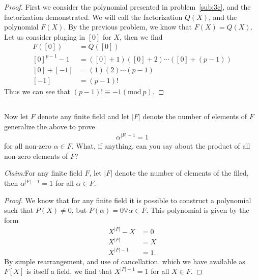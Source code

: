 \documentclass[10pt]{amsart}
\renewcommand{\mod}[2]{#1\left(\text{mod}\ #2\right)}
\newenvironment{claim}[1]{\par\noindent\textit{Claim:}\space#1}{}
\begin{document}
\begin{proof}
  First we consider the polynomial presented in problem~\ref{sub:3c}, and the
  factorization demonstrated. We will call the factorization $Q(X)$, and the
  polynomial $F(X)$. By the previous problem, we know that $F(X)=Q(X)$. Let us
  consider pluging in $[0]$ for $X$, then we find
  \begin{align*}
    F([0])&=Q([0])\\
    {[0]}^{p-1}-1&=([0]+1)([0]+2)\cdots([0]+(p-1))\\
    [0]+[-1]&=(1)(2)\cdots(p-1)\\
    [-1]&=(p-1)!
  \end{align*}
  Thus we can see that $(p-1)!\equiv\mod{-1}{p}$.
\end{proof}

\subsection{}%
\label{sub:3e}

Now let $F$ denote any finite field and let $|F|$ denote the number of elements
of $F$ generalize the above to prove
\begin{align*}
  \alpha^{|F|-1}=1
\end{align*}
for all non-zero $\alpha\in F$. What, if anything, can you say about the
product of all non-zero elements of $F$?

\begin{claim}
  For any finite field $F$, let $|F|$ denote the number of elements of the
  filed, then $\alpha^{|F|-1}=1$ for all $\alpha\in F$.
\end{claim}
\begin{proof}
  We know that for any finite field it is possible to construct a polynomial
  such that $P(X)\neq 0$, but $P(\alpha)=0\forall\alpha\in F$. This polynomial
  is given by the form
  \begin{align*}
    X^{|F|}-X&=0\\
    X^{|F|}&=X\\
    X^{|F|-1}&=1.
  \end{align*}
  By simple rearrangement, and use of cancellation, which we have available as
  $F[X]$ is itself a field, we find that $X^{|F|-1}=1$ for all $X\in F$.
\end{proof}
\end{document}
